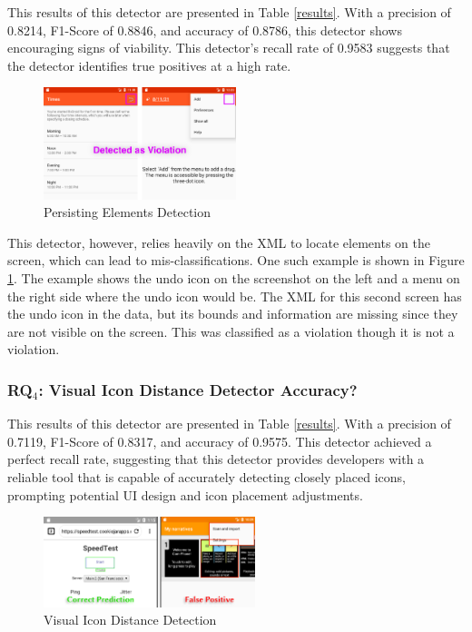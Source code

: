 This results of this detector are presented in Table \ref{results}. With a precision of 0.8214, F1-Score of 0.8846, and accuracy of 0.8786, this detector shows encouraging signs of viability. This detector's recall rate of 0.9583 suggests that the detector identifies true positives at a high rate. 

\begin{figure}[h]
    \centering
    \includegraphics[width=0.5\textwidth]{imgs/persisstingResults.jpg}
    \caption{Persisting Elements Detection}
    \label{persistingResults}
\end{figure}

This detector, however, relies heavily on the XML to locate elements on the screen, which can lead to mis-classifications. One such example is shown in Figure \ref{persistingResults}. The example shows the undo icon on the screenshot on the left and a menu on the right side where the undo icon would be. The XML for this second screen has the undo icon in the data, but its bounds and information are missing since they are not visible on the screen. This was classified as a violation though it is not a violation. 


\subsubsection{RQ$_4$: Visual Icon Distance Detector Accuracy?}
This results of this detector are presented in Table \ref{results}. With a precision of 0.7119, F1-Score of 0.8317, and accuracy of 0.9575. This detector achieved a perfect recall rate, suggesting that this detector provides developers with a reliable tool that is capable of accurately detecting closely placed icons, prompting potential UI design and icon placement adjustments. 

\begin{figure}[h]
    \centering
    \includegraphics[width=0.55\textwidth]{imgs/IconDistanceResults.png}
    \caption{Visual Icon Distance Detection}
    \label{icondistanceResults}
\end{figure}

